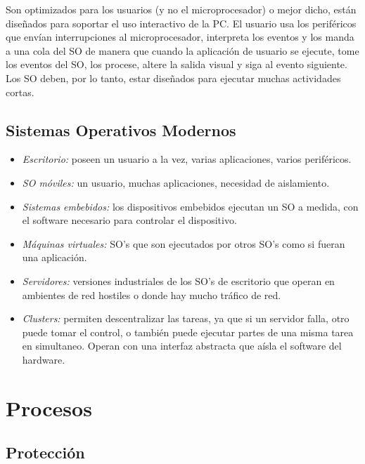 \documentclass[a4paper,10pt,spanish]{article}
\begin{document}
Son optimizados para los usuarios (y no el microprocesador) o mejor dicho, están diseñados para soportar el uso interactivo de la PC. El usuario usa los periféricos que envían interrupciones al microprocesador, interpreta los eventos y los manda a una cola del SO de manera que cuando la aplicación de usuario se ejecute, tome los eventos del SO, los procese, altere la salida visual y siga al evento siguiente. Los SO deben, por lo tanto, estar diseñados para ejecutar muchas actividades cortas. \\

\subsection{Sistemas Operativos Modernos}

\begin{itemize}
\item \textit{Escritorio:} poseen un usuario a la vez, varias aplicaciones, varios periféricos.

\item \textit{SO móviles:} un usuario, muchas aplicaciones, necesidad de aislamiento.

\item \textit{Sistemas embebidos:} los dispositivos embebidos ejecutan un SO a medida, con el software necesario para controlar el dispositivo.

\item \textit{Máquinas virtuales:} SO's que son ejecutados por otros SO's como si fueran una aplicación.

\item \textit{Servidores:} versiones industriales de los SO's de escritorio que operan en ambientes de red hostiles o donde hay mucho tráfico de red.

\item \textit{Clusters:} permiten descentralizar las tareas, ya que si un servidor falla, otro puede tomar el control, o también puede ejecutar partes de una misma tarea en simultaneo. Operan con una interfaz abstracta que aísla el software del hardware.
\end{itemize}

\section{Procesos}

\subsection{Protección}
\end{document}
